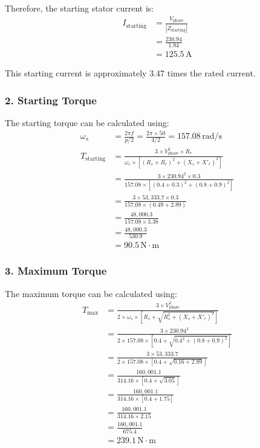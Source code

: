 \documentclass[a4paper,12pt]{IEEEtran}
\begin{document}
Therefore, the starting stator current is:
\begin{align}
    I_{\text{starting}} &= \frac{V_{\text{phase}}}{|Z_{\text{starting}}|} \nonumber \\
    &= \frac{230.94}{1.84} \nonumber \\
    &= 125.5\,\text{A}
\end{align}

This starting current is approximately 3.47 times the rated current.

\subsubsection{2. Starting Torque}

The starting torque can be calculated using:
\begin{align}
    \omega_s &= \frac{2\pi f}{p/2} = \frac{2\pi \times 50}{4/2} = 157.08\,\text{rad/s} \\
    T_{\text{starting}} &= \frac{3 \times V_{\text{phase}}^2 \times R_r}{\omega_s \times \left[(R_s + R_r)^2 + (X_s + X'_r)^2\right]} \nonumber \\
    &= \frac{3 \times 230.94^2 \times 0.3}{157.08 \times \left[(0.4 + 0.3)^2 + (0.8 + 0.9)^2\right]} \nonumber \\
    &= \frac{3 \times 53,333.7 \times 0.3}{157.08 \times (0.49 + 2.89)} \nonumber \\
    &= \frac{48,000.3}{157.08 \times 3.38} \nonumber \\
    &= \frac{48,000.3}{530.9} \nonumber \\
    &= 90.5\,\text{N}\cdot\text{m}
\end{align}

\subsubsection{3. Maximum Torque}

The maximum torque can be calculated using:
\begin{align}
    T_{\text{max}} &= \frac{3 \times V_{\text{phase}}^2}{2 \times \omega_s \times \left[R_s + \sqrt{R_s^2 + (X_s + X'_r)^2}\right]} \nonumber \\
    &= \frac{3 \times 230.94^2}{2 \times 157.08 \times \left[0.4 + \sqrt{0.4^2 + (0.8 + 0.9)^2}\right]} \nonumber \\
    &= \frac{3 \times 53,333.7}{2 \times 157.08 \times \left[0.4 + \sqrt{0.16 + 2.89}\right]} \nonumber \\
    &= \frac{160,001.1}{314.16 \times \left[0.4 + \sqrt{3.05}\right]} \nonumber \\
    &= \frac{160,001.1}{314.16 \times \left[0.4 + 1.75\right]} \nonumber \\
    &= \frac{160,001.1}{314.16 \times 2.15} \nonumber \\
    &= \frac{160,001.1}{675.4} \nonumber \\
    &= 239.1\,\text{N}\cdot\text{m}
\end{align}
\end{document}
